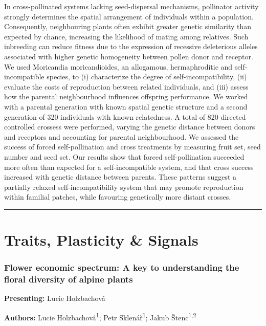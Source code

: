 \documentclass[
  letterpaper,
  DIV=11,
  numbers=noendperiod]{scrartcl}
\begin{document}
In cross-pollinated systems lacking seed-dispersal mechanisms,
pollinator activity strongly determines the spatial arrangement of
individuals within a population. Consequently, neighbouring plants often
exhibit greater genetic similarity than expected by chance, increasing
the likelihood of mating among relatives. Such inbreeding can reduce
fitness due to the expression of recessive deleterious alleles
associated with higher genetic homogeneity between pollen donor and
receptor. We used Moricandia moricandioides, an allogamous,
hermaphroditic and self-incompatible species, to (i) characterize the
degree of self-incompatibility, (ii) evaluate the costs of reproduction
between related individuals, and (iii) assess how the parental
neighbourhood influences offspring performance. We worked with a
parental generation with known spatial genetic structure and a second
generation of 320 individuals with known relatedness. A total of 820
directed controlled crossess were performed, varying the genetic
distance between donors and receptors and accounting for parental
neighbourhood. We assessed the success of forced self-pollination and
cross treatments by measuring fruit set, seed number and seed set. Our
results show that forced self-pollination succeeded more often than
expected for a self-incompatible system, and that cross success
increased with genetic distance between parents. These patterns suggest
a partially relaxed self-incompatibility system that may promote
reproduction within familial patches, while favouring genetically more
distant crosses.

\begin{center}\rule{0.5\linewidth}{0.5pt}\end{center}

\section{Traits, Plasticity \& Signals}\label{traits-plasticity-signals}

\subsubsection{Flower economic spectrum: A key to understanding the
floral diversity of alpine
plants}\label{flower-economic-spectrum-a-key-to-understanding-the-floral-diversity-of-alpine-plants}

\textbf{Presenting:} Lucie Holzbachová

\textbf{Authors:} Lucie Holzbachová\textsuperscript{1}; Petr
Sklenář\textsuperscript{1}; Jakub Štenc\textsuperscript{1,2}
\end{document}
